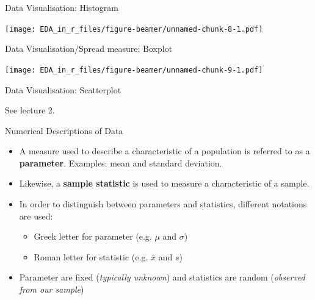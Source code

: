 \documentclass[ignorenonframetext,]{beamer}
\newenvironment{Shaded}{\begin{snugshade}}{\end{snugshade}}
\newcommand{\KeywordTok}[1]{\textcolor[rgb]{0.13,0.29,0.53}{\textbf{#1}}}
\newcommand{\DataTypeTok}[1]{\textcolor[rgb]{0.13,0.29,0.53}{#1}}
\newcommand{\OtherTok}[1]{\textcolor[rgb]{0.56,0.35,0.01}{#1}}
\newcommand{\OperatorTok}[1]{\textcolor[rgb]{0.81,0.36,0.00}{\textbf{#1}}}
\newcommand{\NormalTok}[1]{#1}
\begin{document}
\begin{frame}{Data Visualisation: Histogram}

\texttt{[image: EDA\_in\_r\_files/figure-beamer/unnamed-chunk-8-1.pdf]}

\end{frame}

\begin{frame}[fragile]{Data Visualisation/Spread measure: Boxplot}

\begin{Shaded}
\end{Shaded}

\texttt{[image: EDA\_in\_r\_files/figure-beamer/unnamed-chunk-9-1.pdf]}

\end{frame}

\begin{frame}{Data Visualisation: Scatterplot}

See lecture 2.

\end{frame}

\begin{frame}{Numerical Descriptions of Data}

\begin{itemize}
\item
  A measure used to describe a characteristic of a population is
  referred to as a \textbf{parameter}. Examples: mean and standard
  deviation.
\item
  Likewise, a \textbf{sample statistic} is used to measure a
  characteristic of a sample.
\item
  In order to distinguish between parameters and statistics, different
  notations are used:

  \begin{itemize}
  \item
    Greek letter for parameter (e.g. \(\mu\) and \(\sigma\))
  \item
    Roman letter for statistic (e.g. \(\bar{x}\) and \(s\))
  \end{itemize}
\item
  Parameter are fixed (\emph{typically unknown}) and statistics are
  random (\emph{observed from our sample})
\end{itemize}

\end{frame}
\end{document}
